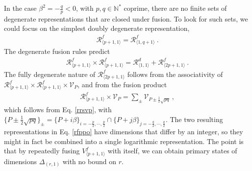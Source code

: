 \documentclass[12pt, a4paper]{article}
\theoremstyle{break}
\begin{document}
In the case $\beta^2=-\frac{q}{p}<0$, with $p,q\in\mathbb{N}^*$ coprime, there are no finite sets of degenerate representations that are closed under fusion. To look for such sets, we could focus on the simplest doubly degenerate representation, 
\begin{align}
 \mathcal{R}^f_{\langle p+1,1\rangle}=\mathcal{R}^f_{\langle 1,q+1\rangle}\ .
\end{align}
The degenerate fusion rules predict  
\begin{align}
 \mathcal{R}^f_{\langle p+1,1\rangle}\times \mathcal{R}^f_{\langle p+1,1\rangle} = \mathcal{R}^d_{\langle 1,1\rangle} + \mathcal{R}^f_{\langle 2p+1,1\rangle}\ .
 \label{rfppo}
\end{align}
The fully degenerate nature of $\mathcal{R}^f_{\langle 2p+1,1\rangle}$ follows from the associativity of $\mathcal{R}^f_{\langle p+1,1\rangle}\times \mathcal{R}^f_{\langle p+1,1\rangle}\times \mathcal{V}_P$, and from the fusion product
\begin{align}
 \mathcal{R}^f_{\langle p+1,1\rangle} \times \mathcal{V}_P = \sum_{\pm} \mathcal{V}_{P\pm \frac12\sqrt{pq}}\ ,
\end{align}
which follows from Eq. \eqref{rrsvp}, with $\{P\pm \frac12\sqrt{pq}\}_\pm = \{P+i\beta\}_{i=-\frac{p}{2},\cdots, \frac{p}{2}} \cap \{P+j\beta\}_{j=-\frac{q}{2},\cdots, \frac{q}{2}}$. 
The two resulting representations in Eq. \eqref{rfppo} have dimensions that differ by an integer, so they might in fact be combined into a single logarithmic representation. The point is that by repeatedly fusing $V^f_{\langle p+1,1\rangle}$ with itself, we can obtain primary states of dimensions $\Delta_{(r,1)}$ with no bound on $r$. 
\end{document}
